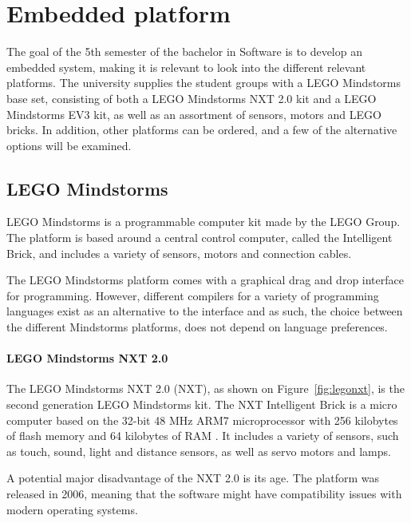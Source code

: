 

\section{Embedded platform}
The goal of the 5th semester of the bachelor in Software is to develop an embedded system, making it is relevant to look into the different relevant platforms.
The university supplies the student groups with a LEGO Mindstorms base set, consisting of both a LEGO Mindstorms NXT 2.0 kit and a LEGO Mindstorms EV3 kit, as well as an assortment of sensors, motors and LEGO bricks.
In addition, other platforms can be ordered, and a few of the alternative options will be examined.

\subsection{LEGO Mindstorms}
LEGO Mindstorms is a programmable computer kit made by the LEGO Group.
The platform is based around a central control computer, called the Intelligent Brick, and includes a variety of sensors, motors and connection cables.

The LEGO Mindstorms platform comes with a graphical drag and drop interface for programming.
However, different compilers for a variety of programming languages exist as an alternative to the interface and as such, the choice between the different Mindstorms platforms, does not depend on language preferences.

\paragraph{LEGO Mindstorms NXT 2.0}
The LEGO Mindstorms NXT 2.0 (NXT), as shown on Figure~\ref{fig:legonxt}, is the second generation LEGO Mindstorms kit.
The NXT Intelligent Brick is a micro computer based on the 32-bit 48 MHz ARM7 microprocessor with 256 kilobytes of flash memory and 64 kilobytes of RAM \cite{nxt2userguide} \cite{nxt2ev3compare}.
It includes a variety of sensors, such as touch, sound, light and distance sensors, as well as servo motors and lamps.

A potential major disadvantage of the NXT 2.0 is its age.
The platform was released in 2006, meaning that the software might have compatibility issues with modern operating systems.

